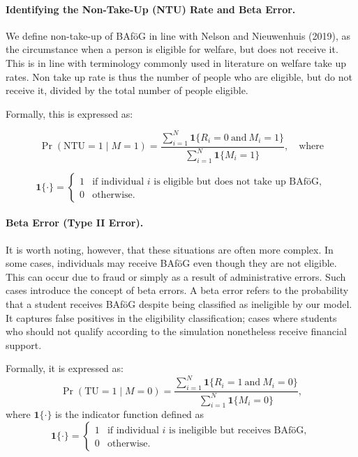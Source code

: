 \paragraph{Identifying the Non-Take-Up (NTU) Rate and Beta Error.} %
We define non-take-up of BAföG in line with Nelson and Nieuwenhuis (2019), as the circumstance when a person is eligible for welfare, but does not receive it. This is in line with terminology commonly used in literature on welfare take up rates. Non take up rate is thus the number of people who are eligible, but do not receive it, divided by the total number of people eligible. 


Formally, this is expressed as:

\begin{equation}
\Pr(\text{NTU} = 1 \mid M = 1) = \frac{\sum_{i=1}^{N} \mathbf{1}\{R_i = 0 \ \text{and} \ M_i = 1\}}{\sum_{i=1}^{N} \mathbf{1}\{M_i = 1\}}, \quad\text{where} 
\end{equation}

\begin{equation}
  \mathbf{1}\{\cdot\} =
  \begin{cases}
  1 & \text{if individual } i \text{ is eligible but does not take up BAföG}, \\
  0 & \text{otherwise}.
  \end{cases}
\label{eq:indicator-function-ntu}
\end{equation}


\paragraph{Beta Error (Type II Error).}  
It is worth noting, however, that these situations are often more complex. 
In some cases, individuals may receive BAföG even though they are not eligible. 
This can occur due to fraud or simply as a result of administrative errors. 
Such cases introduce the concept of beta errors. 
A beta error refers to the probability that a student receives BAföG despite being classified as ineligible by our model. 
It captures false positives in the eligibility classification; cases where students who should not qualify according to the simulation nonetheless receive financial support.

Formally, it is expressed as:
\begin{equation}
\Pr(\text{TU} = 1 \mid M = 0) = \frac{\sum_{i=1}^{N} \mathbf{1}\{R_i = 1 \ \text{and} \ M_i = 0\}}{\sum_{i=1}^{N} \mathbf{1}\{M_i = 0\}},
\end{equation}
where \( \mathbf{1}\{\cdot\} \) is the indicator function defined as
\[
\mathbf{1}\{\cdot\} =
\begin{cases}
1 & \text{if individual } i \text{ is ineligible but receives BAföG}, \\
0 & \text{otherwise}.
\end{cases}
\]

